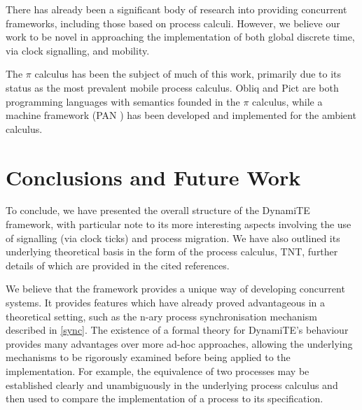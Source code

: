 \documentclass{acm_proc_article-sp}
\begin{document}
There has already been a significant body of research into providing
concurrent frameworks, including those based on process calculi.
However, we believe our work to be novel in approaching the
implementation of both global discrete time, via clock signalling, and
mobility.

The $\pi$ calculus has been the subject of much of this work, primarily
due to its status as the most prevalent mobile process calculus.  Obliq
\cite{obliq} and Pict \cite{daveturner:phd} are both programming
languages with semantics founded in the $\pi$ calculus, while a machine
framework (PAN \cite{sangiorgi:safeambientsmachine}) has been developed
and implemented for the ambient calculus.

\section{Conclusions and Future Work}

To conclude, we have presented the overall structure of the DynamiTE
framework, with particular note to its more interesting aspects
involving the use of signalling (via clock ticks) and process
migration.  We have also outlined its underlying theoretical basis in
the form of the process calculus, TNT, further details of which are
provided in the cited references.

We believe that the framework provides a unique way of developing
concurrent systems.  It provides features which have already proved
advantageous in a theoretical setting, such as the n-ary process
synchronisation mechanism described in \ref{sync}.  The existence of a
formal theory for DynamiTE's behaviour provides many advantages over
more ad-hoc approaches, allowing the underlying mechanisms to be
rigorously examined before being applied to the implementation.  For
example, the equivalence of two processes may be established clearly and
unambiguously in the underlying process calculus and then used to
compare the implementation of a process to its specification.
\end{document}
